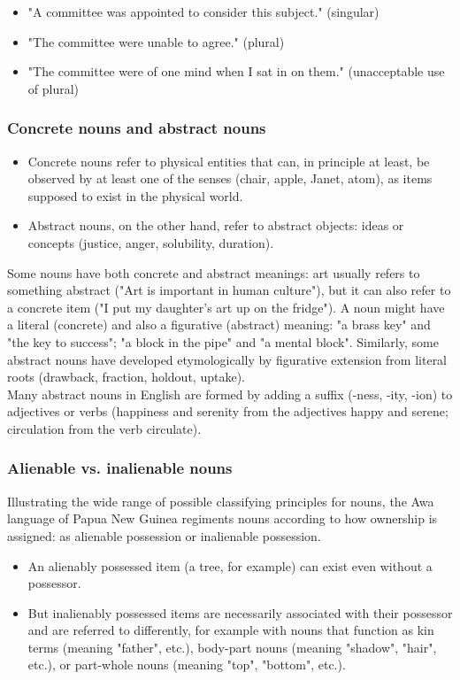 \begin{itemize}
    \item "A committee was appointed to consider this subject." (singular)
    \item "The committee were unable to agree." (plural)
    \item "The committee were of one mind when I sat in on them." (unacceptable use of plural)
\end{itemize}

\subsubsection{Concrete nouns and abstract nouns \cite{wiki-noun}}
\begin{itemize}
    \item Concrete nouns refer to physical entities that can, in principle at least, be observed by at least one of the senses (chair, apple, Janet, atom), as items supposed to exist in the physical world.
    \item Abstract nouns, on the other hand, refer to abstract objects: ideas or concepts (justice, anger, solubility, duration).
\end{itemize}
Some nouns have both concrete and abstract meanings: art usually refers to something abstract ("Art is important in human culture"), but it can also refer to a concrete item ("I put my daughter's art up on the fridge"). A noun might have a literal (concrete) and also a figurative (abstract) meaning: "a brass key" and "the key to success"; "a block in the pipe" and "a mental block". Similarly, some abstract nouns have developed etymologically by figurative extension from literal roots (drawback, fraction, holdout, uptake).\\

Many abstract nouns in English are formed by adding a suffix (-ness, -ity, -ion) to adjectives or verbs (happiness and serenity from the adjectives happy and serene; circulation from the verb circulate).


\subsubsection{Alienable vs. inalienable nouns}
Illustrating the wide range of possible classifying principles for nouns, the Awa language of Papua New Guinea regiments nouns according to how ownership is assigned: as alienable possession or inalienable possession. 
\begin{itemize}
    \item An alienably possessed item (a tree, for example) can exist even without a possessor.
    \item But inalienably possessed items are necessarily associated with their possessor and are referred to differently, for example with nouns that function as kin terms (meaning "father", etc.), body-part nouns (meaning "shadow", "hair", etc.), or part-whole nouns (meaning "top", "bottom", etc.).
\end{itemize}



